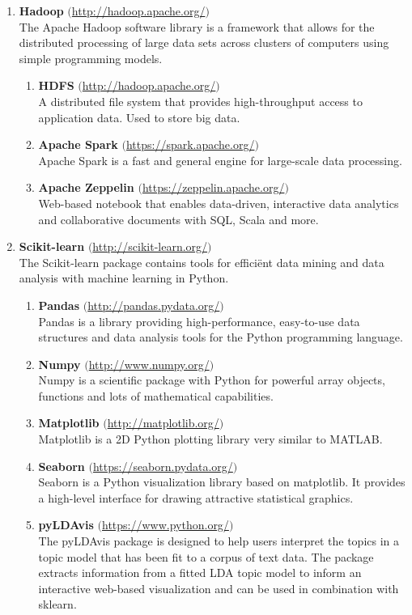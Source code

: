 \begin{enumerate}
    \item \textbf{Hadoop} $($\url{http://hadoop.apache.org/}$)$ \\
    The Apache Hadoop software library is a framework that allows for the distributed processing of large data sets across clusters of computers using simple programming models. 
    \begin{enumerate}
        \item \textbf{HDFS} $($\url{http://hadoop.apache.org/}$)$ \\
        A distributed file system that provides high-throughput access to application data. Used to store big data.
        \item \textbf{Apache Spark} $($\url{https://spark.apache.org/}$)$\\
        Apache Spark is a fast and general engine for large-scale data processing.
        \item \textbf{Apache Zeppelin} $($\url{https://zeppelin.apache.org/}$)$ \\
         Web-based notebook that enables data-driven, interactive data analytics and collaborative documents with SQL, Scala and more.
    \end{enumerate}
    
    \item \textbf{Scikit-learn} $($\url{http://scikit-learn.org/}$)$ \\
    The Scikit-learn package contains tools for effici\"ent data mining and data analysis with machine learning in Python.
    \begin{enumerate}
        \item \textbf{Pandas} $($\url{http://pandas.pydata.org/}$)$ \\
        Pandas is a library providing high-performance, easy-to-use data structures and data analysis tools for the Python programming language.
        \item \textbf{Numpy} $($\url{http://www.numpy.org/}$)$ \\
        Numpy is a scientific package with Python for powerful array objects, functions and lots of mathematical capabilities.
        \item \textbf{Matplotlib} $($\url{http://matplotlib.org/}$)$ \\
        Matplotlib is a 2D Python plotting library very similar to MATLAB.
        \item \textbf{Seaborn} $($\url{https://seaborn.pydata.org/}$)$ \\
        Seaborn is a Python visualization library based on matplotlib. It provides a high-level interface for drawing attractive statistical graphics.
        \item \textbf{pyLDAvis} $($\url{https://www.python.org/}$)$\\
        The pyLDAvis package is designed to help users interpret the topics in a topic model that has been fit to a corpus of text data. The package extracts information from a fitted LDA topic model to inform an interactive web-based visualization and can be used in combination with sklearn.
    \end{enumerate}
    

\end{enumerate}
